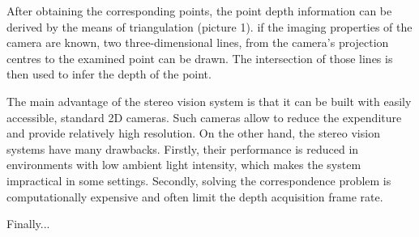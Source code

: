 After obtaining the corresponding points, the point depth information can be derived by the means of triangulation (picture 1). if the imaging properties of the camera are known, two three-dimensional lines, from the camera's projection centres to the examined point can be drawn. The intersection of those lines is then used to infer the depth of the point. 

The main advantage of the stereo vision system is that it can be built with easily accessible, standard 2D cameras. Such cameras allow to reduce the expenditure and provide relatively high resolution. On the other hand, the stereo vision systems have many drawbacks. Firstly, their performance is reduced in environments with low ambient light intensity, which makes the system impractical in some settings. Secondly, solving the correspondence problem is computationally expensive and often limit the depth acquisition frame rate. \begin{Huge} Finally...
\end{Huge} 


